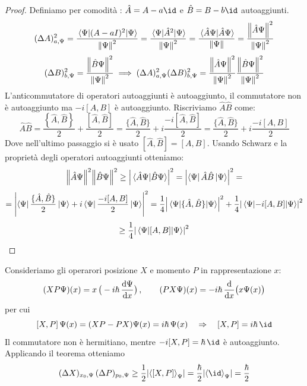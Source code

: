 \begin{proof}
    Definiamo per comodità : \(\hat{A} = A- a \id\) e \(\hat{B} = B - b\id\) autoaggiunti.
    \[
        (\Delta A)_{a,\Psi}^2 = \frac{\expval{(A-aI)^2}{\Psi}}{\norm{\Psi}^2} = \frac{\expval{\hat{A}^2}{\Psi}}{\norm{\Psi}^2} = \frac{\braket*{\hat{A}\Psi}{\hat{A}\Psi}}{\norm{\Psi}} = \frac{\norm{\hat{A}\Psi}^2}{\norm{\Psi}^2}
    \]
    \[
        (\Delta B)_{b,\Psi}^2 =\frac{\norm{\hat{B}\Psi}^2}{\norm{\Psi}^2} \implies  (\Delta A)_{a,\Psi}^2(\Delta B)_{b,\Psi}^2 = \frac{\norm{\hat{A}\Psi}^2}{\norm{\Psi}^2}\frac{\norm{\hat{B}\Psi}^2}{\norm{\Psi}^2} 
    \]
    L'anticommutatore di operatori autoaggiunti è autoaggiunto, il commutatore non è autoaggiunto ma \(-i[A,B]\) è autoaggiunto. Riscriviamo \(\hat{A}\hat{B}\) come:
    \[
        \hat{A}\hat{B}= \frac{\left\{ \hat{A},\hat{B} \right\}}{2} + \frac{[\hat{A},\hat{B}]}{2} = \frac{\{ \hat{A},\hat{B} \}}{2} + i \frac{-i[\hat{A},\hat{B}]}{2}=\frac{\{ \hat{A},\hat{B} \}}{2} + i \frac{-i[A,B]}{2}
    \]
    Dove nell'ultimo passaggio si è usato \([\hat{A},\hat{B}]= [A,B]\).
    Usando Schwarz e la proprietà degli operatori autoaggiunti otteniamo:
    \[
        \norm{\hat{A}\Psi}^2\norm{\hat{B}\Psi}^2 \geq \abs{\braket*{\hat{A}\Psi}{\hat{B}\Psi}}^2 = \abs{\bra{\Psi}\hat{A}\hat{B}\ket{\Psi}}^2=
    \]
    \[
        = \abs{\bra{\Psi}\frac{\{\hat{A},\hat{B}\}}{2}\ket{\Psi} + i \bra{\Psi}\frac{-i[A,B]}{2}\ket{\Psi}}^2
        = \frac{1}{4}\abs{\expval*{\{\hat{A},\hat{B}\}}{\Psi}}^2 + \frac{1}{4}\abs{\expval{-i[A,B]}{\Psi}}^2 
    \]
    \[
        \geq \frac{1}{4}\abs{\expval{[A,B]}{\Psi}}^2
    \]
\end{proof}

\begin{example}
    Consideriamo gli operarori posizione \(X\) e momento \(P\) in rappresentazione \(x\):
    \[
        (XP\Psi)(x)= x\,\big(-i\hbar\,\dv{\Psi}{x}\big)\,,\qquad (PX\Psi)(x)= -i\hbar\,\dv{}{x}\big(x\Psi(x)\big)
    \]
    per cui
    \[
        [X,P]\,\Psi(x)= (XP-PX)\Psi(x)= i\hbar\,\Psi(x) \quad \Rightarrow \quad [X,P]= i\hbar\,\id
    \]
    Il commutatore non è hermitiano, mentre \(-i[X,P]= \hbar\,\id\) è autoaggiunto. Applicando il teorema otteniamo
    \[
        (\Delta X)_{x_0,\Psi}\,(\Delta P)_{p_0,\Psi} \geq \frac{1}{2}\abs{\expval{[X,P]}_\Psi}
        = \frac{\hbar}{2} \abs{\expval{\id}_\Psi}= \frac{\hbar}{2}
    \]
\end{example}

